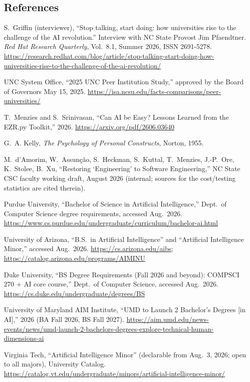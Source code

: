 \documentclass[11pt]{article}
\begin{document}
\newpage
\subsection*{References}
\begin{enumerate}[itemsep=2pt,label={[\arabic*]}]
\item S.~Griffin (interviewer), ``Stop talking, start doing: how universities rise to the challenge of the AI revolution.'' Interview with NC State Provost Jim Pfaendtner. \emph{Red Hat Research Quarterly}, Vol.~8.1, Summer 2026, ISSN 2691-5278. \url{https://research.redhat.com/blog/article/stop-talking-start-doing-how-universities-rise-to-the-challenge-of-the-ai-revolution/}
\item UNC System Office, ``2025 UNC Peer Institution Study,'' approved by the Board of Governors May 15, 2025. \url{https://isa.ncsu.edu/facts-comparisons/peer-universities/}
\item T.~Menzies and S.~Srinivasan, ``Can AI be Easy? Lessons Learned from the EZR.py Toolkit,'' 2026. \url{https://arxiv.org/pdf/2606.03640}
\item G.~A. Kelly, \emph{The Psychology of Personal Constructs}, Norton, 1955.
\item M.~d'Amorim, W.~Assunção, S.~Heckman, S.~Kuttal, T.~Menzies, J.-P.~Ore, K.~Stolee, B.~Xu, ``Restoring `Engineering' to Software Engineering,'' NC State CSC faculty working draft, August 2026 (internal; sources for the cost/testing statistics are cited therein).
\item Purdue University, ``Bachelor of Science in Artificial Intelligence,'' Dept.\ of Computer Science degree requirements, accessed Aug.\ 2026. \url{https://www.cs.purdue.edu/undergraduate/curriculum/bachelor-ai.html}
\item University of Arizona, ``B.S.\ in Artificial Intelligence'' and ``Artificial Intelligence Minor,'' accessed Aug.\ 2026. \url{https://cs.arizona.edu/aibs}; \url{https://catalog.arizona.edu/programs/AIMINU}
\item Duke University, ``BS Degree Requirements (Fall 2026 and beyond): COMPSCI 270 + AI core course,'' Dept.\ of Computer Science, accessed Aug.\ 2026. \url{https://cs.duke.edu/undergraduate/degrees/BS}
\item University of Maryland AIM Institute, ``UMD to Launch 2 Bachelor's Degrees [in AI],'' 2026 (BA Fall 2026, BS Fall 2027). \url{https://aim.umd.edu/news-events/news/umd-launch-2-bachelors-degrees-explore-technical-human-dimensions-ai}
\item Virginia Tech, ``Artificial Intelligence Minor'' (declarable from Aug.\ 3, 2026; open to all majors), University Catalog. \url{https://catalog.vt.edu/undergraduate/minors/artificial-intelligence-minor/}
\end{enumerate}
\end{document}
